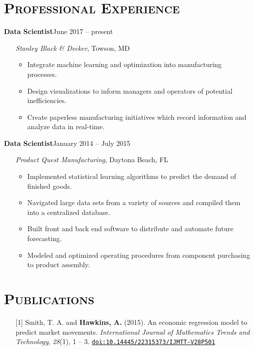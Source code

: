\documentclass[10pt]{article}
\begin{document}
\section*{\textsc{Professional Experience}}
\textbf{Data Scientist}\hfill June 2017 -- present
\begin{itemize}[noitemsep]
	\item[] \textit{Stanley Black \& Decker}, Towson, MD
	\begin{itemize}[noitemsep]
		\item Integrate machine learning and optimization into manufacturing processes.
		\item Design visualizations to inform managers and operators of potential inefficiencies.
		\item Create paperless manufacturing initiatives which record information and analyze data in real-time.
	\end{itemize}
\end{itemize}
\textbf{Data Scientist}\hfill January 2014 -- July 2015
\begin{itemize}[noitemsep]
    \item[] \textit{Product Quest Manufacturing}, Daytona Beach, FL
    \begin{itemize}[noitemsep]
        \item Implemented statistical learning algorithms to predict the demand of finished goods.
        \item Navigated large data sets from a variety of sources and compiled them into a centralized database.
        \item Built front and back end software to distribute and automate future forecasting.
        \item Modeled and optimized operating procedures from component purchasing to product assembly.
    \end{itemize}
\end{itemize}

\section*{\textsc{Publications}}
\begin{itemize}[leftmargin=*]
    \item[] [1] Smith, T. A. and \textbf{Hawkins, A.} (2015). An economic regression model to predict market movements. \textit{International Journal of Mathematics Trends and Technology}, \textit{28}(1), 1 -- 3. \texttt{\href{http://dx.doi.org/10.14445/22315373/IJMTT-V28P501}{doi:10.14445/22315373/IJMTT-V28P501}}
\end{itemize}
\end{document}
